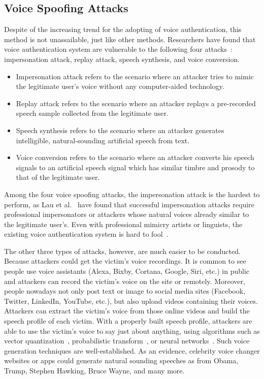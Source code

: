 \subsection{Voice Spoofing Attacks}\label{sec:spoof}
Despite of the increasing trend for the adopting of voice authentication, this method is not unassailable, just like other methods. Researchers have found that voice authentication system are vulnerable to the following four attacks~\cite{wu2015spoofing}: impersonation attack, replay attack, speech synthesis, and voice conversion.
\begin{itemize}
	\item  Impersonation attack refers to the scenario where an attacker tries to mimic the legitimate user’s voice without any computer-aided technology.
	\item Replay attack refers to the scenario where an attacker replays a pre-recorded speech sample collected from the legitimate user. 
	\item Speech synthesis refers to the scenario where an attacker generates intelligible, natural-sounding artificial speech from text.
	\item Voice conversion refers to the scenario where an attacker converts his speech signals to an artificial speech signal which has similar timbre and prosody to that of the legitimate user.
\end{itemize}


Among the four voice spoofing attacks, the impersonation attack is the hardest to perform, as Lau et al.~\cite{lau2005testing} have found that successful impersonation attacks require professional impersonators or attackers whose natural voices already similar to the legitimate user's. Even with professional mimicry artists or linguists, the existing voice authentication system is hard to fool~\cite{mariethoz2005can}.


The other three types of attacks, however, are much easier to be conducted. Because attackers could get the victim's voice recordings. It is common to see people use voice assistants (Alexa, Bixby, Cortana, Google, Siri, etc.) in public and attackers can record the victim's voice on the site or remotely. Moreover, people nowadays not only post text or image to social media sites (Facebook, Twitter, LinkedIn, YouTube, etc.), but also upload videos containing their voices. Attackers can extract the victim's voice from those online videos and build the speech profile of each victim. With a properly built speech profile, attackers are able to use the victim's voice to say just about anything, using algorithms such as vector quantization~\cite{abe1990voice}, probabilistic transform~\cite{stylianou1998continuous}, or neural networks~\cite{desai2009voice}. Such voice generation techniques are well-established. As an evidence, celebrity voice changer websites or apps could generate natural sounding speeches as from Obama, Trump, Stephen Hawking, Bruce Wayne, and many more.




